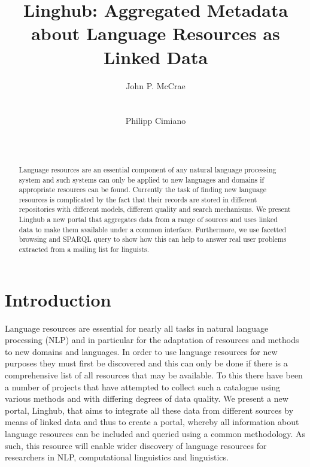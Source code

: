 \documentclass{acm_proc_article-sp}
\begin{document}
\title{Linghub: Aggregated Metadata about Language Resources as Linked Data}

\author{
\alignauthor
John P. McCrae\\
       \\
       \\
\alignauthor
Philipp Cimiano\\
       \\
       \\
   }

\maketitle
\begin{abstract}
    Language resources are an essential component of any natural language
    processing system and such systems can only be applied to new languages and
    domains if appropriate resources can be found. Currently the task of finding
    new language resources is complicated by the fact that their records are
    stored in different repositories with different models, different quality
    and search mechanisms. We present Linghub a new portal that aggregates data
    from a range of sources and uses linked data to make them available under a
    common interface. Furthermore, we use facetted browsing and SPARQL query to
    show how this can help to answer real user problems extracted from a mailing
    list for linguists.
\end{abstract}

\section{Introduction}

Language resources are essential for nearly all tasks in natural language
processing (NLP) and in particular
for the adaptation of resources and methods to new domains and languages. In
order to use language resources for new purposes they must first be discovered
and this can only be done if there is a comprehensive list of all resources that
may be available. To this there have been a number of projects that have
attempted to collect such a catalogue using various methods and with differing
degrees of data quality. We present a new portal, Linghub, that aims to integrate all
these data from different sources by means of linked data and thus to create a
portal, whereby all information about language resources can be included and
queried using a common methodology. As such, this resource will enable wider
discovery of language resources for researchers in NLP, computational
linguistics and linguistics.
\end{document}
